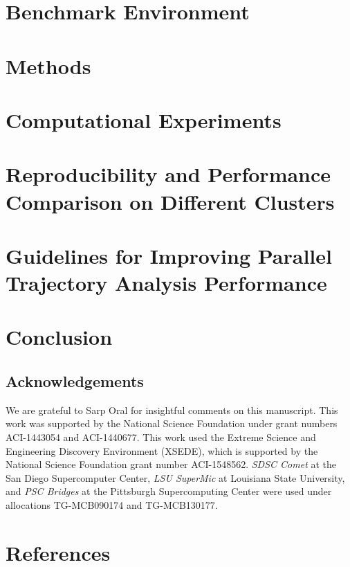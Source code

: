 \documentclass[review]{elsarticle}
\begin{document}
\section{Benchmark Environment}


\section{Methods}


\section{Computational Experiments}


\section{Reproducibility and Performance Comparison on Different Clusters}


\section{Guidelines for Improving Parallel Trajectory Analysis Performance}


\section{Conclusion}



\subsection*{Acknowledgements}
\label{acknowledgements}


We are grateful to Sarp Oral for insightful comments on this manuscript.
This work was supported by the National Science Foundation under grant numbers ACI-1443054 and ACI-1440677.
This work used the Extreme Science and Engineering Discovery Environment (XSEDE), which is supported by the National Science Foundation grant number ACI-1548562.
\emph{SDSC Comet} at the San Diego Supercomputer Center, \emph{LSU SuperMic} at Louisiana State University, and \emph{PSC Bridges} at the Pittsburgh Supercomputing Center were used under allocations TG-MCB090174 and TG-MCB130177.

\section*{References}
\end{document}

